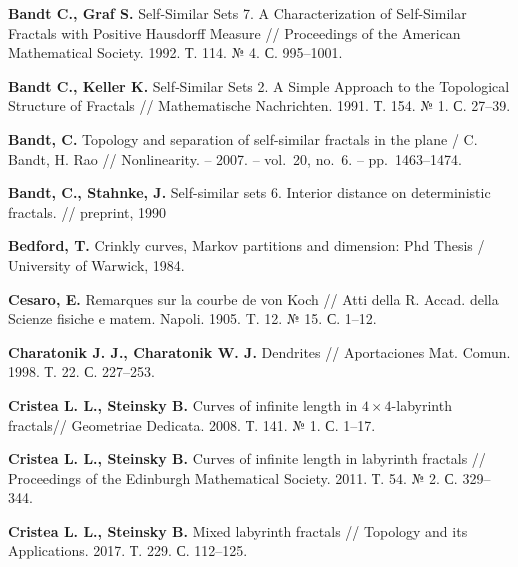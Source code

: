 %
%




\begin{thebibliography}{99}

{\bf Bandt C., Graf S. }
Self-Similar Sets 7. A Characterization of Self-Similar Fractals with Positive Hausdorff Measure // Proceedings of the American Mathematical Society. 1992. Т. 114. № 4. С. 995–1001.

{\bf Bandt C., Keller K.}
Self‐Similar Sets 2. A Simple Approach to the Topological Structure of Fractals // 
Mathematische Nachrichten. 1991. Т. 154. № 1. С. 27--39.

  {\bf Bandt, C.} Topology and separation of self-similar fractals in the plane / C. Bandt, H. Rao // Nonlinearity. -- 2007. -- vol.~20, no.~6. -- pp.~1463--1474.

{\bf Bandt, C., Stahnke, J.}
Self-similar sets 6. Interior distance on deterministic fractals. //
preprint, 1990

{\bf Bedford, T. }
Crinkly curves, Markov partitions and dimension: Phd Thesis / University of Warwick, 1984.

{\bf Cesaro, E.} 
Remarques sur la courbe de von Koch // 
Atti della R. Accad. della Scienze fisiche e matem. Napoli. 1905. T. 12. № 15. С. 1--12.

{\bf Charatonik J. J., Charatonik W. J.}
Dendrites // 
Aportaciones Mat. Comun. 1998. Т. 22. С. 227--253.

{\bf Cristea L. L., Steinsky B. }
Curves of infinite length in $4\times4$-labyrinth fractals// 
Geometriae Dedicata. 2008. Т. 141. № 1. С. 1--17.


{\bf Cristea L. L., Steinsky B. }
Curves of infinite length in labyrinth fractals // 
Proceedings of the Edinburgh Mathematical Society. 2011. Т. 54. № 2. С. 329--344.


{\bf Cristea L. L., Steinsky B. }
Mixed labyrinth fractals // 
Topology and its Applications. 2017. Т. 229. С. 112--125.


\end{thebibliography}
